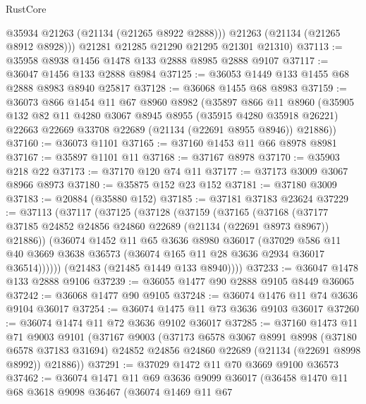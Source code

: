 \begin{lexlean}{RustCore}
\begin{coremodule}
          @35934
          @21263
          (@21134 (@21265 @8922 @2888)))
        @21263
        (@21134 (@21265 @8912 @8928)))
      @21281
      @21285
      @21290
      @21295
      @21301
      @21310)
@37113 := @35958 @8938 @1456 @1478 @133 @2888 @8985 @2888 @9107
@37117 := @36047 @1456 @133 @2888 @8984
@37125 := @36053 @1449 @133 @1455 @68 @2888 @8983 @8940 @25817
@37128 := @36068 @1455 @68 @8983
@37159 := @36073
    @866
    @1454
    @11
    @67
    @8960
    @8982
    (@35897
      @866
      @11
      @8960
      (@35905
        @132
        @82
        @11
        @4280
        @3067
        @8945
        @8955
        (@35915 @4280 @35918 @26221)
        @22663
        @22669
        @33708
        @22689
        (@21134 (@22691 @8955 @8946))
        @21886))
@37160 := @36073 @1101
@37165 := @37160 @1453 @11 @66 @8978 @8981
@37167 := @35897 @1101 @11
@37168 := @37167 @8978
@37170 := @35903 @218 @22
@37173 := @37170 @120 @74 @11
@37177 := @37173 @3009 @3067 @8966 @8973
@37180 := @35875 @152 @23 @152
@37181 := @37180 @3009
@37183 := @20884 (@35880 @152)
@37185 := @37181 @37183 @23624
@37229 := @37113
    (@37117
      (@37125
        (@37128
          (@37159
            (@37165
              (@37168
                (@37177 @37185 @24852 @24856 @24860 @22689 (@21134 (@22691 @8973 @8967)) @21886))
              (@36074
                @1452
                @11
                @65
                @3636
                @8980
                @36017
                (@37029
                  @586
                  @11
                  @40
                  @3669
                  @3638
                  @36573
                  (@36074 @165 @11 @28 @3636 @2934 @36017 @36514))))))
        (@21483 (@21485 @1449 @133 @8940))))
@37233 := @36047 @1478 @133 @2888 @9106
@37239 := @36055 @1477 @90 @2888 @9105 @8449 @36065
@37242 := @36068 @1477 @90 @9105
@37248 := @36074 @1476 @11 @74 @3636 @9104 @36017
@37254 := @36074 @1475 @11 @73 @3636 @9103 @36017
@37260 := @36074 @1474 @11 @72 @3636 @9102 @36017
@37285 := @37160
    @1473
    @11
    @71
    @9003
    @9101
    (@37167
      @9003
      (@37173
        @6578
        @3067
        @8991
        @8998
        (@37180 @6578 @37183 @31694)
        @24852
        @24856
        @24860
        @22689
        (@21134 (@22691 @8998 @8992))
        @21886))
@37291 := @37029 @1472 @11 @70 @3669 @9100 @36573
@37462 := @36074
    @1471
    @11
    @69
    @3636
    @9099
    @36017
    (@36458
      @1470
      @11
      @68
      @3618
      @9098
      @36467
      (@36074
        @1469
        @11
        @67

\end{coremodule}
\end{lexlean}
